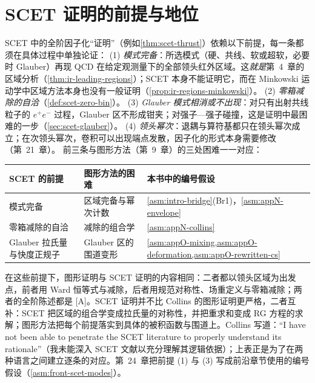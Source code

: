 \section{SCET 证明的前提与地位}\label{sec:scet-status}

\begin{remark}\label{rem:scet-assumptions}
SCET 中的全阶因子化“证明”（例如\cref{thm:scet-thrust}）依赖以下前提，每一条都须在具体过程中单独论证：
(1) \emph{模式完备}：所选模式（硬、共线、软或超软，必要时 Glauber）再现 QCD 在给定观测量下的全部领头红外区域。这\emph{就是}第~4~章的区域分析（\cref{thm:ir-leading-regions}）；SCET 本身不能证明它，而在 Minkowski 运动学中区域方法本身也没有一般证明（\cref{prop:ir-regions-minkowski}）。
(2) \emph{零箱减除的自洽}（\cref{def:scet-zero-bin}）。
(3) \emph{Glauber 模式相消或不出现}：对只有出射共线粒子的 $e^+e^-$ 过程，Glauber 区不形成钳夹；对强子—强子碰撞，这是证明中最困难的一步（\cref{sec:scet-glauber}）。
(4) \emph{领头幂次}：退耦与算符基都只在领头幂次成立；在次领头幂次，卷积可以出现端点发散，因子化的形式本身需要修改（第~21~章）。
前三条与图形方法（第~9~章）的三处困难一一对应：
\begin{center}\small
\renewcommand{\arraystretch}{1.1}
\begin{tabular}{@{}lll@{}}
\toprule
SCET 的前提 & 图形方法的困难 & 本书中的编号假设 \\
\midrule
模式完备 & 区域完备与幂次计数 & \cref{asm:intro-bridge}(Br1)，\cref{asm:appN-envelope} \\
零箱减除的自洽 & 减除的组合学 & \cref{asm:appN-collins} \\
Glauber 拉氏量与快度正规子 & Glauber 区的围道变形 & \cref{asm:appO-mixing,asm:appO-deformation,asm:appO-rewritten-cs} \\
\bottomrule
\end{tabular}
\end{center}
在这些前提下，图形证明与 SCET 证明的内容相同：二者都以领头区域为出发点，前者用 Ward 恒等式与减除，后者用规范对称性、场重定义与零箱减除；两者的全阶陈述都是 [A]。SCET 证明并不比 Collins 的图形证明更严格，二者互补：SCET 把区域的组合学变成拉氏量的对称性，并把重求和变成 RG 方程的求解；图形方法把每个前提落实到具体的被积函数与围道上。Collins 写道：“I have not been able to penetrate the SCET literature to properly understand its rationale”（我未能深入 SCET 文献以充分理解其逻辑依据）\cite[第~15.9~节]{Collins2011}；上表正是为了在两种语言之间建立逐条的对应。第~24~章把前提 (1) 与 (3) 写成前沿章节使用的编号假设（\cref{asm:front-scet-modes}）。
\end{remark}


